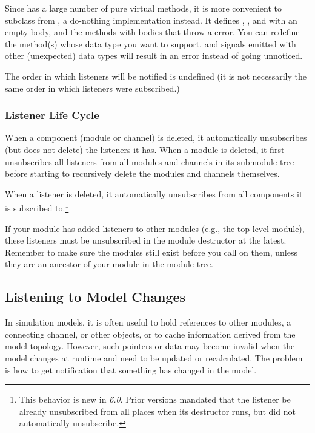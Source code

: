 Since  has a large number of pure virtual methods, it is more
convenient to subclass from , a do-nothing implementation
instead. It defines , , and
 with an empty body, and the 
methods with bodies that throw a  error.
You can redefine the  method(s) whose data type
you want to support, and signals emitted with other (unexpected) data
types will result in an error instead of going unnoticed.

The order in which listeners will be notified is undefined (it is not necessarily
the same order in which listeners were subscribed.)

\subsubsection{Listener Life Cycle}
\label{sec:simple-modules:signals:life-cycle}

When a component (module or channel) is deleted, it automatically
unsubscribes (but does not delete) the listeners it has. When a
module is deleted, it first unsubscribes all listeners from all
modules and channels in its submodule tree before starting
to recursively delete the modules and channels themselves.

When a listener is deleted, it automatically unsubscribes from all components
it is subscribed to.\footnote{This behavior is new in \textit{{\opp} 6.0}. Prior versions
mandated that the listener be already unsubscribed from all places when its
destructor runs, but did not automatically unsubscribe.}

\begin{note}
  If your module has added listeners to other modules (e.g., the top-level
  module), these listeners must be unsubscribed in the module
  destructor at the latest. Remember to make sure the modules still exist before you
  call  on them, unless they are an ancestor
  of your module in the module tree.
\end{note}


\subsection{Listening to Model Changes}
\label{sec:simple-modules:model-change}

In simulation models, it is often useful to hold references to other
modules, a connecting channel, or other objects, or to cache information
derived from the model topology. However, such pointers or data may
become invalid when the model changes at runtime and need to be updated
or recalculated. The problem is how to get notification that something has
changed in the model.

